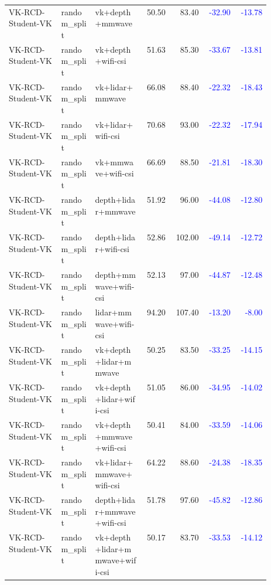 \begin{longtable}{p{0.20\linewidth}p{0.13\linewidth}p{0.19\linewidth}rrrr}
VK-RCD-Student-VK & random\_split & vk+depth+mmwave & 50.50 & 83.40 & \textcolor{blue}{-32.90} & \textcolor{blue}{-13.78}\\
VK-RCD-Student-VK & random\_split & vk+depth+wifi-csi & 51.63 & 85.30 & \textcolor{blue}{-33.67} & \textcolor{blue}{-13.81}\\
VK-RCD-Student-VK & random\_split & vk+lidar+mmwave & 66.08 & 88.40 & \textcolor{blue}{-22.32} & \textcolor{blue}{-18.43}\\
VK-RCD-Student-VK & random\_split & vk+lidar+wifi-csi & 70.68 & 93.00 & \textcolor{blue}{-22.32} & \textcolor{blue}{-17.94}\\
VK-RCD-Student-VK & random\_split & vk+mmwave+wifi-csi & 66.69 & 88.50 & \textcolor{blue}{-21.81} & \textcolor{blue}{-18.30}\\
VK-RCD-Student-VK & random\_split & depth+lidar+mmwave & 51.92 & 96.00 & \textcolor{blue}{-44.08} & \textcolor{blue}{-12.80}\\
VK-RCD-Student-VK & random\_split & depth+lidar+wifi-csi & 52.86 & 102.00 & \textcolor{blue}{-49.14} & \textcolor{blue}{-12.72}\\
VK-RCD-Student-VK & random\_split & depth+mmwave+wifi-csi & 52.13 & 97.00 & \textcolor{blue}{-44.87} & \textcolor{blue}{-12.48}\\
VK-RCD-Student-VK & random\_split & lidar+mmwave+wifi-csi & 94.20 & 107.40 & \textcolor{blue}{-13.20} & \textcolor{blue}{-8.00}\\
VK-RCD-Student-VK & random\_split & vk+depth+lidar+mmwave & 50.25 & 83.50 & \textcolor{blue}{-33.25} & \textcolor{blue}{-14.15}\\
VK-RCD-Student-VK & random\_split & vk+depth+lidar+wifi-csi & 51.05 & 86.00 & \textcolor{blue}{-34.95} & \textcolor{blue}{-14.02}\\
VK-RCD-Student-VK & random\_split & vk+depth+mmwave+wifi-csi & 50.41 & 84.00 & \textcolor{blue}{-33.59} & \textcolor{blue}{-14.06}\\
VK-RCD-Student-VK & random\_split & vk+lidar+mmwave+wifi-csi & 64.22 & 88.60 & \textcolor{blue}{-24.38} & \textcolor{blue}{-18.35}\\
VK-RCD-Student-VK & random\_split & depth+lidar+mmwave+wifi-csi & 51.78 & 97.60 & \textcolor{blue}{-45.82} & \textcolor{blue}{-12.86}\\
VK-RCD-Student-VK & random\_split & vk+depth+lidar+mmwave+wifi-csi & 50.17 & 83.70 & \textcolor{blue}{-33.53} & \textcolor{blue}{-14.12}\\
\bottomrule
\end{longtable}
